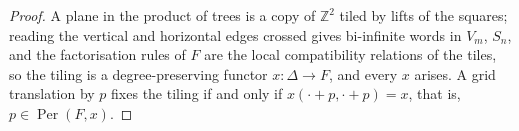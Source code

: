 \documentclass[10pt,a4paper]{amsart}
\newcommand{\Per}{\operatorname{Per}}
\newcommand{\Sn}{S_n}
\newcommand{\Vm}{V_m}
\newcommand{\ZZ}{\mathbb{Z}}
\begin{document}
\begin{proof}
A plane in the product of trees is a copy of $\ZZ^2$ tiled by lifts of the squares;
reading the vertical and horizontal edges crossed gives bi-infinite words in $\Vm$,
$\Sn$, and the factorisation rules of $F$ are the local compatibility relations of
the tiles, so the tiling is a degree-preserving functor $x\colon\Delta\to F$, and
every $x$ arises. A grid translation by $p$ fixes the tiling if and only if
$x(\cdot+p,\cdot+p)=x$, that is, $p\in\Per(F,x)$.
\end{proof}
\end{document}
